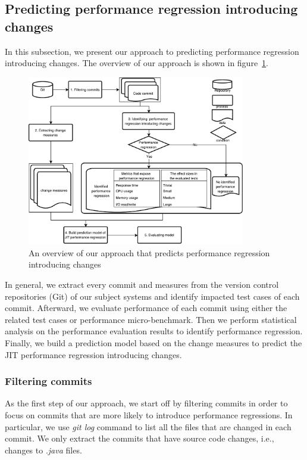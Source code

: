 \subsection{Predicting performance regression introducing changes}
In this subsection, we present our approach to predicting performance regression introducing changes. The overview of our approach is shown in figure~\ref{fig:workflow}.
\begin{figure}
	\centering
	\includegraphics[width=0.85\textwidth]{workflow.pdf}
	\centering \caption{An overview of our approach that predicts performance regression introducing changes}
	\label{fig:workflow}
\end{figure}
In general, we extract every commit and measures from the version control repositories (Git) of our subject systems and identify impacted test cases of each commit. Afterward, we evaluate performance of each commit using either the related test cases or performance micro-benchmark. Then we perform statistical analysis on the performance evaluation results to identify performance regression. Finally, we build a prediction model based on the change measures to predict the JIT performance regression introducing changes.

\subsubsection{Filtering commits}
As the first step of our approach, we start off by filtering commits in order to focus on commits that are more likely to introduce performance regressions. In particular, we use \emph{git log} command to list all the files that are changed in each commit. We only extract the commits that have source code changes, i.e., changes to \emph{$.$java} files. 

